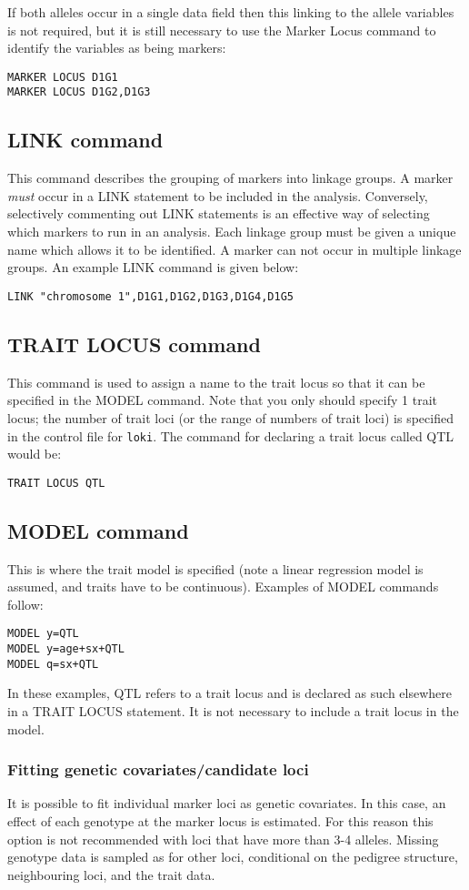 \documentclass[10pt,a4paper]{article}
\newcommand{\Loki}{\texttt{loki}\xspace}
\begin{document}
If both alleles occur in a single data field then this linking to the allele
variables is not required, but it is still necessary to use the Marker Locus
command to identify the variables as being markers:
\begin{verbatim}
MARKER LOCUS D1G1
MARKER LOCUS D1G2,D1G3
\end{verbatim}

\subsection{LINK command}
This command describes the grouping of markers into linkage groups.  A marker
\emph{must} occur in a LINK statement to be included in the analysis.
Conversely, selectively commenting out LINK statements is an effective way
of selecting which markers to run in an analysis.  Each linkage group must
be given a unique name which allows it to be identified.  A marker can not
occur in multiple linkage groups.  An example LINK command is given below:
\begin{verbatim}
LINK "chromosome 1",D1G1,D1G2,D1G3,D1G4,D1G5
\end{verbatim}
\subsection{TRAIT LOCUS command}
This command is used to assign a name to the trait locus so that it can be
specified in the MODEL command.  Note that you only should specify 1 trait
locus; the number of trait loci (or the range of numbers of trait loci) is
specified in the control file for \Loki.  The command for declaring a trait
locus called QTL would be:
\begin{verbatim}
TRAIT LOCUS QTL
\end{verbatim}
\subsection{MODEL command}
This is where the trait model is specified (note a linear regression model is
assumed, and traits have to be continuous).  Examples of MODEL commands follow:
\begin{verbatim}
MODEL y=QTL
MODEL y=age+sx+QTL
MODEL q=sx+QTL
\end{verbatim}
In these examples, QTL refers to a trait locus and is declared as such elsewhere
in a TRAIT LOCUS statement.  It is not necessary to include a trait locus in the
model.
\subsubsection{Fitting genetic covariates/candidate loci}
It is possible to fit individual marker loci as genetic covariates.  In this
case, an effect of each genotype at the marker locus is estimated.  For this
reason this option is not recommended with loci that have more than 3-4
alleles.  Missing genotype data is sampled as for other loci, conditional on
the pedigree structure, neighbouring loci, and the trait data.
\end{document}
